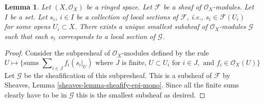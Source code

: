 \documentclass[10pt,a4paper]{amsart}
\theoremstyle{plain}
\newtheorem{lemma}[subsection]{Lemma}
\theoremstyle{definition}
\theoremstyle{remark}
\numberwithin{equation}{subsection}
\begin{document}
\begin{lemma}
\label{lemma-generated-by-local-sections}
Let $(X, \mathcal{O}_X)$ be a ringed space.
Let $\mathcal{F}$ be a sheaf of $\mathcal{O}_X$-modules.
Let $I$ be a set. Let $s_i$, $i \in I$ be a collection
of local sections of $\mathcal{F}$, i.e., $s_i \in \mathcal{F}(U_i)$
for some opens $U_i \subset X$. There exists a unique smallest
subsheaf of $\mathcal{O}_X$-modules $\mathcal{G}$ such
that each $s_i$ corresponds to a local section of
$\mathcal{G}$.
\end{lemma}

\begin{proof}
Consider the subpresheaf of $\mathcal{O}_X$-modules
defined by the rule
$$
U
\longmapsto
\{
\text{sums } \sum\nolimits_{i \in J} f_i (s_i|_U)
\text{ where } J \text{ is finite, }
U \subset U_i \text{ for } i\in J, \text{ and }
f_i \in \mathcal{O}_X(U)
\}
$$
Let $\mathcal{G}$ be the sheafification of this subpresheaf.
This is a subsheaf of $\mathcal{F}$ by
Sheaves, Lemma \ref{sheaves-lemma-sheafify-epi-mono}.
Since all the finite sums clearly have to be in $\mathcal{G}$
this is the smallest subsheaf as desired.
\end{proof}
\end{document}
